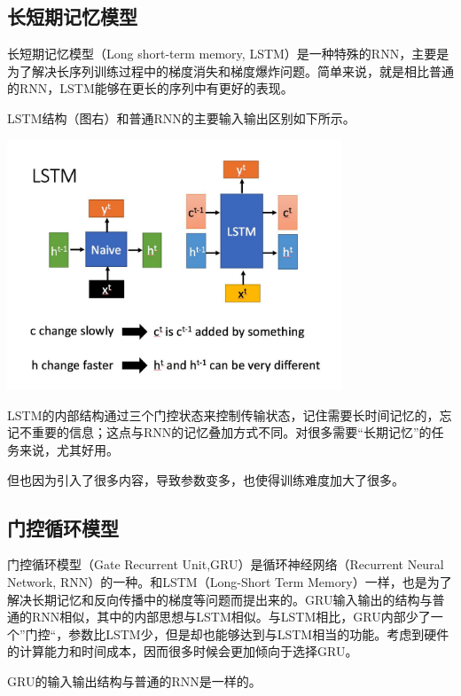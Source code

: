 \documentclass{article}
\begin{document}
\subsection{长短期记忆模型}
长短期记忆模型（Long short-term memory, LSTM）是一种特殊的RNN，主要是为了解决长序列训练过程中的梯度消失和梯度爆炸问题。简单来说，就是相比普通的RNN，LSTM能够在更长的序列中有更好的表现。\par 
LSTM结构（图右）和普通RNN的主要输入输出区别如下所示。\par 
\centerline{\includegraphics[width=10cm]{lstmi}}
LSTM的内部结构通过三个门控状态来控制传输状态，记住需要长时间记忆的，忘记不重要的信息；这点与RNN的记忆叠加方式不同。对很多需要“长期记忆”的任务来说，尤其好用。\par 
但也因为引入了很多内容，导致参数变多，也使得训练难度加大了很多。
\subsection{门控循环模型}
门控循环模型（Gate Recurrent Unit,GRU）是循环神经网络（Recurrent Neural Network, RNN）的一种。和LSTM（Long-Short Term Memory）一样，也是为了解决长期记忆和反向传播中的梯度等问题而提出来的。GRU输入输出的结构与普通的RNN相似，其中的内部思想与LSTM相似。与LSTM相比，GRU内部少了一个”门控“，参数比LSTM少，但是却也能够达到与LSTM相当的功能。考虑到硬件的计算能力和时间成本，因而很多时候会更加倾向于选择GRU。\par
GRU的输入输出结构与普通的RNN是一样的。
\end{document}
